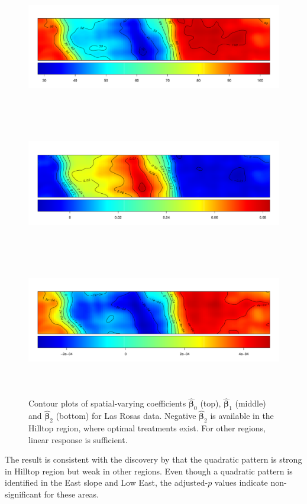 \documentclass[a4paper]{article}   	%
\begin{document}
	\begin{figure}[!htp]
		\centering	
		\includegraphics[width=\textwidth, height=6cm]{Images/STRand_b0}
		\includegraphics[width=\textwidth, height=6cm]{Images/STRand_b1}
		\includegraphics[width=\textwidth, height=6cm]{Images/STRand_b2}
		\caption{Contour plots of spatial-varying coefficients $\hat{\bm{\beta}}_0$ (top), $\hat{\bm{\beta}}_1$ (middle) and $\hat{\bm{\beta}}_2$ (bottom) for Las Rosas data. Negative $\hat{\bm{\beta}}_2$ is available in the Hilltop region, where optimal treatments exist. For other regions, linear response is sufficient. }\label{fig:betasprd}
	\end{figure}
	
	The result is consistent with the discovery by \textcite{Rakshit2020Novel} that the quadratic pattern is strong in Hilltop region but weak in other regions. Even though a quadratic pattern is identified in the East slope and Low East, the adjusted-$p$ values indicate non-significant for these areas. 
	
\end{document}
